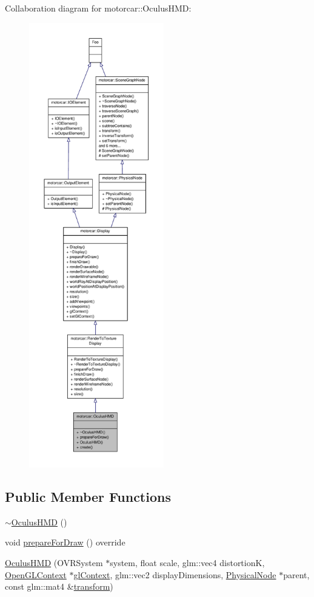 Collaboration diagram for motorcar\-:\-:Oculus\-H\-M\-D\-:
\nopagebreak
\begin{figure}[H]
\begin{center}
\leavevmode
\includegraphics[height=550pt]{classmotorcar_1_1OculusHMD__coll__graph}
\end{center}
\end{figure}
\subsection*{Public Member Functions}
\begin{DoxyCompactItemize}
\item 
\hyperlink{classmotorcar_1_1OculusHMD_a69e38487ae0a51504663dd942fbb068e}{$\sim$\-Oculus\-H\-M\-D} ()
\item 
void \hyperlink{classmotorcar_1_1OculusHMD_ae9834ea50d728809532b7a48f7ed1738}{prepare\-For\-Draw} () override
\item 
\hyperlink{classmotorcar_1_1OculusHMD_a7daaa17d97d685302186d118f013509c}{Oculus\-H\-M\-D} (O\-V\-R\-System $\ast$system, float scale, glm\-::vec4 distortion\-K, \hyperlink{classmotorcar_1_1OpenGLContext}{Open\-G\-L\-Context} $\ast$\hyperlink{classmotorcar_1_1Display_a884dd0b78dbecee82a33eb6d26a2a403}{gl\-Context}, glm\-::vec2 display\-Dimensions, \hyperlink{classmotorcar_1_1PhysicalNode}{Physical\-Node} $\ast$parent, const glm\-::mat4 \&\hyperlink{classmotorcar_1_1SceneGraphNode_ad96e79fdd739ac8223a3128003be391a}{transform})
\end{DoxyCompactItemize}
